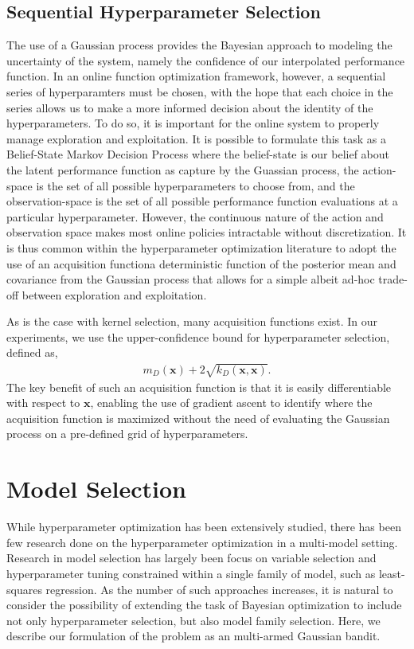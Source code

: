 \documentclass{article}
\newcommand{\x}{\mathbf{x}}
\begin{document}
\subsection{Sequential Hyperparameter Selection}
The use of a Gaussian process provides the Bayesian approach to modeling the uncertainty of the system, namely the confidence of our interpolated performance function. In an online function optimization framework, however, a sequential series of hyperparamters must be chosen, with the hope that each choice in the series allows us to make a more informed decision about the identity of the hyperparameters. To do so, it is important for the online system to properly manage exploration and exploitation. It is possible to formulate this task as a Belief-State Markov Decision Process where the belief-state is our belief about the latent performance function as capture by the Guassian process, the action-space is the set of all possible hyperparameters to choose from, and the observation-space is the set of all possible performance function evaluations at a particular hyperparameter. However, the continuous nature of the action and observation space makes most online policies intractable without discretization. It is thus common within the hyperparameter optimization literature to adopt the use of an acquisition function\textemdash a deterministic function of the posterior mean and covariance from the Gaussian process that allows for a simple albeit ad-hoc trade-off between exploration and exploitation. 

As is the case with kernel selection, many acquisition functions exist. In our experiments, we use the upper-confidence bound for hyperparameter selection, defined as,
\begin{align}
  m_D(\x) + 2\sqrt{k_D(\x, \x)}.
\end{align}
The key benefit of such an acquisition function is that it is easily differentiable with respect to $\x$, enabling the use of gradient ascent to identify where the acquisition function is maximized without the need of evaluating the Gaussian process on a pre-defined grid of hyperparameters. 

\section{Model Selection}
While hyperparameter optimization has been extensively studied, there has been few research done on the hyperparameter optimization in a multi-model setting. Research in model selection has largely been focus on variable selection and hyperparameter tuning constrained within a single family of model, such as least-squares regression. As the number of such approaches increases, it is natural to consider the possibility of extending the task of Bayesian optimization to include not only hyperparameter selection, but also model family selection. Here, we describe our formulation of the problem as an multi-armed Gaussian bandit. 
\end{document}
